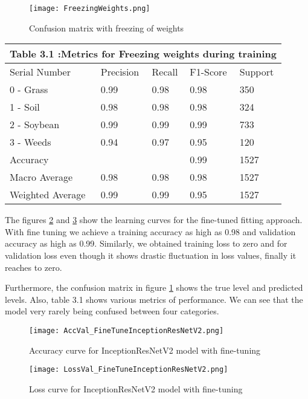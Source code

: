 \documentclass{report}
\begin{document}
\begin{figure}[H]
\centering
\texttt{[image: FreezingWeights.png]}
\caption{Confusion matrix with freezing of weights}
\label{fig:CM2}
\end{figure}
\begin{tabular}[H]{ | p{3cm}||p{2cm}||p{2cm}||p{2cm}||p{2cm}|}
\hline
 \multicolumn{5}{|c|}{ Table 3.1 :Metrics for Freezing weights during training}\\
 \hline
 Serial Number & Precision & Recall & F1-Score & Support\\
 \hline
 0 - Grass & 0.99 & 0.98 & 0.98 & 350 \\
 1 - Soil & 0.98 & 0.98 & 0.98 & 324\\
 2 - Soybean & 0.99 & 0.99 & 0.99 & 733\\
 3 - Weeds & 0.94 & 0.97 & 0.95 & 120 \\
 Accuracy &  &  & 0.99 & 1527\\
 Macro Average & 0.98 & 0.98 & 0.98 & 1527\\
 Weighted Average & 0.99 & 0.99 & 0.95 & 1527\\
 \hline
\end{tabular}


\vspace{1cm}
The figures \ref{fig:Unfroozen1} and \ref{fig:Unfroozen2} show the learning curves for the fine-tuned fitting approach. With fine tuning we achieve a training accuracy as high as 0.98 and validation accuracy as high as 0.99. Similarly, we obtained training loss to zero and for validation loss even though it shows drastic fluctuation in loss values, finally it reaches to zero. 






Furthermore, the confusion matrix in figure \ref{fig:CM2} shows the true level and predicted levels. Also, table 3.1 shows various metrics of performance.  We can see that the model very rarely being confused between four categories. 




\hfill


\begin{figure}[H]
\centering
\texttt{[image: AccVal\_FineTuneInceptionResNetV2.png]}
\caption{Accuracy curve for InceptionResNetV2 model with fine-tuning}
\label{fig:Unfroozen1}
\end{figure}

\begin{figure}[H]
\centering
\texttt{[image: LossVal\_FineTuneInceptionResNetV2.png]}
\caption{ Loss curve for InceptionResNetV2 model with fine-tuning}
\label{fig:Unfroozen2}
\end{figure}
\end{document}
